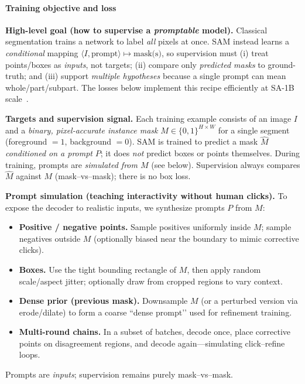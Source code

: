 \begin{enrichment}
\begin{enrichment}
		\paragraph{Training objective and loss}
		\label{enr:par_chapter15_sam_training}
		
		\noindent\textbf{High-level goal (how to supervise a \emph{promptable} model).}
		Classical segmentation trains a network to label \emph{all} pixels at once. SAM instead learns a \emph{conditional} mapping
		\(\langle I,\text{prompt}\rangle \!\mapsto\! \text{mask(s)}\),
		so supervision must (i) treat points/boxes as \emph{inputs}, not targets; (ii) compare only \emph{predicted masks} to ground-truth; and (iii) support \emph{multiple hypotheses} because a single prompt can mean whole/part/subpart. The losses below implement this recipe efficiently at SA-1B scale~\cite{kirillov2023_sam}.
		
		\medskip
		\noindent\textbf{Targets and supervision signal.}
		Each training example consists of an image \(I\) and a \emph{binary, pixel-accurate instance mask}
		\(M \in \{0,1\}^{H\times W}\) for a single segment (foreground \(=1\), background \(=0\)).
		SAM is trained to predict a mask \(\hat{M}\) \emph{conditioned on a prompt} \(P\); it does \emph{not} predict boxes or points themselves.
		During training, prompts are \emph{simulated from \(M\)} (see below).
		Supervision always compares \(\hat{M}\) against \(M\) (mask–vs–mask); there is no box loss.
		
		\noindent\textbf{Prompt simulation (teaching interactivity without human clicks).}
		To expose the decoder to realistic inputs, we synthesize prompts \(P\) from \(M\):
		\begin{itemize}
			\item \textbf{Positive / negative points.} Sample positives uniformly inside \(M\); sample negatives outside \(M\)
			(optionally biased near the boundary to mimic corrective clicks).
			\item \textbf{Boxes.} Use the tight bounding rectangle of \(M\), then apply random scale/aspect jitter;
			optionally draw from cropped regions to vary context.
			\item \textbf{Dense prior (previous mask).} Downsample \(M\) (or a perturbed version via erode/dilate) to form a
			coarse “dense prompt’’ used for refinement training.
			\item \textbf{Multi-round chains.} In a subset of batches, decode once, place corrective points on disagreement regions,
			and decode again—simulating click–refine loops.
		\end{itemize}
		Prompts are \emph{inputs}; supervision remains purely mask–vs–mask.
		

\end{enrichment}
\end{enrichment}
